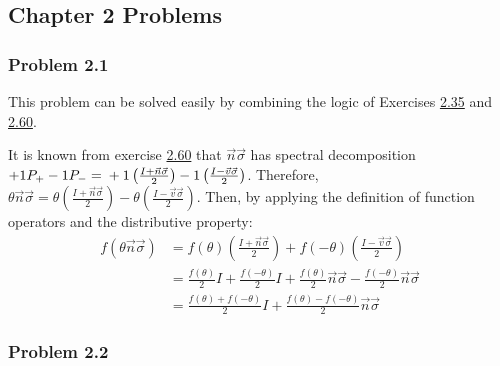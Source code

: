 \subsection{Chapter 2 Problems}
\subsubsection{Problem 2.1}
This problem can be solved easily by combining the
logic of Exercises
\hyperref[sec:nielsen-and-chuang-exercise-2-35]{2.35} and
\hyperref[sec:nielsen-and-chuang-exercise-2-60]{2.60}.

It is known from exercise \hyperref[sec:nielsen-and-chuang-exercise-2-60]{2.60}
that $\vec{n} \vec{\sigma}$ has spectral decomposition
$+1P_+ - 1P_- = \\ +1 \left( \frac{I + \vec{n}\vec{\sigma}}{2} \right)
-1 \left( \frac{I - \vec{v}\vec{\sigma}}{2} \right)$.
Therefore, $\theta \vec{n} \vec{\sigma} =
\theta \left( \frac{I + \vec{n}\vec{\sigma}}{2} \right)
- \theta \left( \frac{I - \vec{v}\vec{\sigma}}{2} \right)$.
Then, by applying the definition of function operators and
the distributive property:
%
\begin{align}
    f(\theta \vec{n} \vec{\sigma}) &= f(\theta) \left(
        \frac{I + \vec{n}\vec{\sigma}}{2} \right) +
        f(-\theta) \left( \frac{I - \vec{v}\vec{\sigma}}{2} \right) \\
    &= \frac{f(\theta)}{2}I + \frac{f(-\theta)}{2}I +
        \frac{f(\theta)}{2}\vec{n}\vec{\sigma} -
        \frac{f(-\theta)}{2}\vec{n}\vec{\sigma} \\
    &= \frac{f(\theta) + f(-\theta)}{2}I +
        \frac{f(\theta) - f(-\theta)}{2}\vec{n}\vec{\sigma}
\end{align}


\subsubsection{Problem 2.2}

